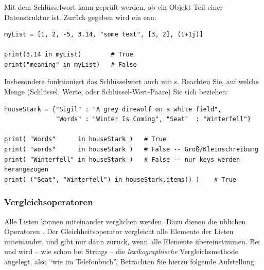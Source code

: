 \subsubsection{}
Mit dem Schlüsselwort  kann geprüft werden, ob ein Objekt Teil einer Datenstruktur ist. Zurück gegeben wird ein ean:

\begin{codebox}
\begin{verbatim}
myList = [1, 2, -5, 3.14, "some text", [3, 2], (1+1j)]

print(3.14 in myList)        # True
print("meaning" in myList)   # False
\end{verbatim}
\end{codebox}

Insbesondere funktioniert das Schlüsselwort  auch mit s. Beachten Sie, auf welche Menge (Schlüssel, Werte, oder Schlüssel-Wert-Paare) Sie sich beziehen:

\begin{codebox}
\begin{verbatim}
houseStark = {"Sigil" : "A grey direwolf on a white field",
              "Words" : "Winter Is Coming", "Seat"  : "Winterfell"}

print( "Words"      in houseStark )   # True
print( "words"      in houseStark )   # False -- Groß/Kleinschreibung
print( "Winterfell" in houseStark )   # False -- nur keys werden herangezogen
print( ("Seat", "Winterfell") in houseStark.items() )    # True
\end{verbatim}
\end{codebox}


\subsubsection{Vergleichsoperatoren}
Alle Listen können miteinander verglichen werden. Dazu dienen die üblichen Operatoren \inPy{<, ==, >}. Der Gleichheitsoperator \inPy{==} vergleicht alle Elemente der Listen miteinander, und gibt nur dann  zurück, wenn alle Elemente übereinstimmen. Bei \inPy{<} und \inPy{>} wird -- wie schon bei Strings -- die \emph{lexikographische} Vergleichsmethode angelegt, also \enquote{wie im Telefonbuch}.
Betrachten Sie hierzu folgende Aufstellung:
\begin{center}
	\\
	\inPy{[1, 5, 2] < [1, 4] < [1, 4, 1] < [2, 1, 1]}
\end{center}

